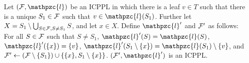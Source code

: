 \documentclass[envcountsect, envcountsame, 11pt]{../lib/llncs2e/llncs}
\def\cF{{\cal F}}
\def\hS{{\hat S}}
\def\cl{\mathpzc{l}}
\def\icpplpr{Property}
\def\assign{\leftarrow}
\newcommand{\set}[1]{\left\{ #1\right\}}
\begin{document}
%
\begin{lemma}
\label{lem:invar3}
Let $(\cF,\cl)$ be an ICPPL in which there is a leaf $v \in T$ such that there is a unique $S_1 \in \cF$ such that $v \in \cl(S_1)$.  
Further let $X = S_1 \setminus \bigcup_{S \in \cF, S \ne S_1}S$, and let $x \in X$. 
Define $\cl'$ and $\cF'$ as follows:
  For all $S \in \cF$ such that $S \ne S_1$,
    $\cl'(S) = \cl(S)$, $\cl'(\{x\}) = \{v\}$, 
   $\cl'(S_1 \setminus \{x\}) = \cl(S_1) \setminus \{v\}$, and 
    $\cF' \assign (\cF \setminus \{S_1\}) \cup \{\{x\}, S_1 \setminus \{x\}\} $.
    $(\cF',\cl')$ is an ICPPL.
    \end{lemma}
\end{document}
